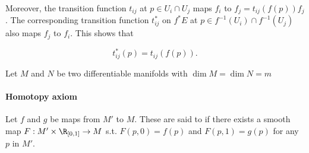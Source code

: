 Moreover, the transition function $t_{ij}$ at $p \in U_i \cap U_j$ maps $f_i$ to $f_j = t_{ij}(f(p)) f_j$.
The corresponding transition function $t_{ij}^{*}$ on $f^* E$ at $p \in f^{-1}(U_i) \cap f^{-1}(U_j)$ also maps $f_j$ to $f_i$.
This shows that 

$$
    t_{ij}^{*}(p) = t_{ij}(f(p)). 
$$


\begin{mdframed}[style=MyFrame]

    Let $M$ and $N$ be two differentiable manifolds with $\dim M = \dim N = m$

\end{mdframed}

\smallbreak

\paragraph{Homotopy axiom}

\begin{df}
    Let $f$ and $g$ be maps from $M'$ to $M$. These are said to  if there exists a smooth map $F: M' \times \R_{[0,1]} \rightarrow M$ s.t. $F(p,0) = f(p)$ and $F(p,1) = g(p)$ for any $p$ in $M'$. 
\end{df}
